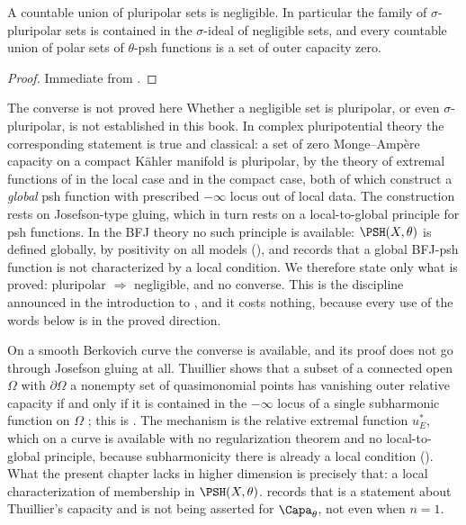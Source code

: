 \begin{corollary}
\label{cor:ch25-polar-countable}
A countable union of pluripolar sets is negligible.  In particular the
family of $\sigma$-pluripolar sets is contained in the
$\sigma$-ideal of negligible sets, and every countable union of polar sets
of $\theta$-psh functions is a set of outer capacity zero.
\end{corollary}

\begin{proof}
Immediate from .
\end{proof}

\begin{warning}{The converse is not proved here}
Whether a negligible set is pluripolar, or even
$\sigma$-pluripolar, is not established in this book.  In complex
pluripotential theory the corresponding statement is true and classical: a
set of zero Monge--Amp\`ere capacity on a compact K\"ahler manifold is
pluripolar, by the theory of extremal functions of \cite{BT82} in the local
case and \cite{GZ05} in the compact case, both of which construct a
\emph{global} psh function with prescribed $-\infty$ locus out of local
data.  The construction rests on Josefson-type gluing, which in turn rests on
a local-to-global principle for psh functions.  In the BFJ theory no such
principle is available: $\PSH(X,\theta)$ is defined globally, by
positivity on all models (), and
 records that a global BFJ-psh function is not
characterized by a local condition.  We therefore state only what is proved:
pluripolar $\Rightarrow$ negligible, and no converse.  This is the
discipline announced in the introduction to , and it costs
nothing, because every use of the words below is in the proved direction.
\end{warning}

\begin{remark}
\label{rem:ch25-curve-converse}
On a smooth Berkovich curve the converse is available, and its proof does
not go through Josefson gluing at all.  Thuillier shows that a subset of a
connected open $\Omega$ with $\partial\Omega$ a nonempty set of
quasimonomial points has vanishing outer relative capacity if and only if it
is contained in the $-\infty$ locus of a single subharmonic function on
$\Omega$ \cite[Th\'eor\`eme~3.6.11]{Thu05}; this is
.  The mechanism is the relative extremal
function $u^*_E$, which on a curve is available with no regularization
theorem and no local-to-global principle, because subharmonicity there is
already a local condition ().  What the
present chapter lacks in higher dimension is precisely that: a local
characterization of membership in $\PSH(X,\theta)$.
 records that
 is a statement about Thuillier's capacity
and is not being asserted for $\Capa_\theta$, not even when $n=1$.
\end{remark}

